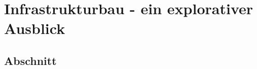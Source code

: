 \chapter{Infrastrukturbau - ein explorativer Ausblick}
\label{ch:infrastrukturbau}

\section{Abschnitt}
\label{sec: 7}